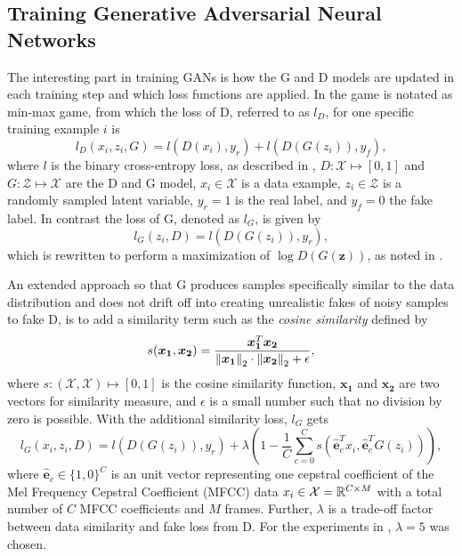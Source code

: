 \subsection{Training Generative Adversarial Neural Networks}\label{sec:nn_adv_train}
The interesting part in training GANs is how the G and D models are updated in each training step and which loss functions are applied.
In  the game is notated as min-max game, from which the loss of D, referred to as $l_D$, for one specific training example $i$ is
\begin{equation}
  l_D(x_i, z_i, G) = l(D(x_i), y_r) + l(D(G(z_i)), y_f),
\end{equation}
where $l$ is the binary cross-entropy loss, as described in , $D: \mathcal{X} \mapsto [0, 1]$ and $G: \mathcal{Z} \mapsto \mathcal{X}$ are the D and G model, $x_i \in \mathcal{X}$ is a data example, $z_i \in \mathcal{Z}$ is a randomly sampled latent variable, $y_r = 1$ is the real label, and $y_f = 0$ the fake label.
In contrast the loss of G, denoted as $l_G$, is given by
\begin{equation}
  l_G(z_i, D) =  l(D(G(z_i)), y_r),
\end{equation}
which is rewritten to perform a maximization of $\log D(G(\bm{z}))$, as noted in .

An extended approach so that G produces samples specifically similar to the data distribution and does not drift off into creating unrealistic fakes of noisy samples to fake D, is to add a similarity term such as the \emph{cosine similarity} defined by
\begin{equation}
  s(\bm{x_1}, \bm{x_2}) = \frac{\bm{x_1}^T \bm{x_2}}{\norm{\bm{x_1}}_2 \cdot \norm{\bm{x_2}}_2 + \epsilon},
\end{equation}
where $s : (\mathcal{X}, \mathcal{X}) \mapsto [0, 1]$ is the cosine similarity function, $\bm{x_1}$ and $\bm{x_2}$ are two vectors for similarity measure, and $\epsilon$ is a small number such that no division by zero is possible.
With the additional similarity loss, $l_G$ gets
\begin{equation}
  l_G(x_i, z_i, D) =  l(D(G(z_i)), y_r) + \lambda \left(1 - \frac{1}{C} \sum_{c=0}^{C} s(\hat{\bm{e}}_c^T x_i , \hat{\bm{e}}_c^T G(z_i)) \right),
\end{equation}
where $\hat{\bm{e}}_c \in \{1, 0\}^C$ is an unit vector representing one cepstral coefficient of the Mel Frequency Cepstral Coefficient (MFCC) data $x_i \in \mathcal{X} = \mathbb{R}^{C \times M}$ with a total number of $C$ MFCC coefficients and $M$ frames.
Further, $\lambda$ is a trade-off factor between data similarity and fake loss from D.
For the experiments in , $\lambda = 5$ was chosen.

